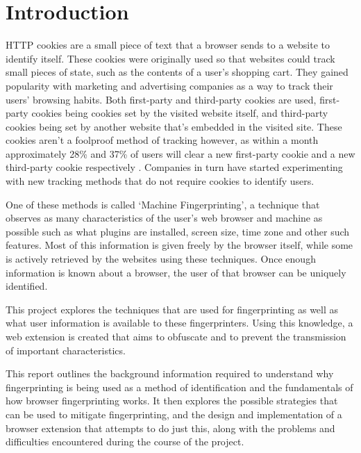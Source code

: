 \chapter{Introduction}

HTTP cookies are a small piece of text that a browser sends to a website to identify itself. These cookies were originally used so that websites could track small pieces of state, such as the contents of a user's shopping cart.
They gained popularity with marketing and advertising companies as a way to track their users' browsing habits.
Both first-party and third-party cookies are used, first-party cookies being cookies set by the visited website itself, and third-party cookies being set by another website that's embedded in the visited site.
These cookies aren't a foolproof method of tracking however, as within a month approximately 28\% and 37\% of users will clear a new first-party cookie and a new third-party cookie respectively \citep{comScore-cookies}.
Companies in turn have started experimenting with new tracking methods that do not require cookies to identify users.

One of these methods is called `Machine Fingerprinting', a technique that observes as many characteristics of the user's web browser and machine as possible such as what plugins are installed, screen size, time zone and other such features.
Most of this information is given freely by the browser itself, while some is actively retrieved by the websites using these techniques.
Once enough information is known about a browser, the user of that browser can be uniquely identified.

This project explores the techniques that are used for fingerprinting as well as what user information is available to these fingerprinters. Using this knowledge, a web extension is created that aims to obfuscate and to prevent the transmission of important characteristics.

This report outlines the background information required to understand why fingerprinting is being used as a method of identification and the fundamentals of how browser fingerprinting works.
It then explores the possible strategies that can be used to mitigate fingerprinting, and the design and implementation of a browser extension that attempts to do just this, along with the problems and difficulties encountered during the course of the project.

